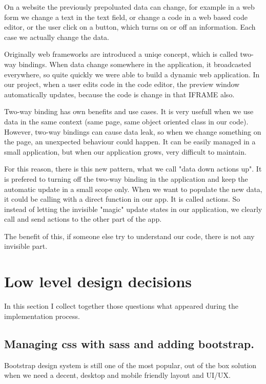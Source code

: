 \documentclass[12pt, a4paper, oneside, openright, medskipamount]{report}
\begin{document}
On a website the previously prepoluated data can change, for example in a web form we change a text in the text field, or change a code in a web based code editor, or the user click on a button, which turns on or off an information. Each case we actually change the data.

Originally web frameworks are introduced a uniqe concept, which is called two-way bindings. When data change somewhere in the application, it broadcasted everywhere, so quite quickly we were able to build a dynamic web application. In our project, when a user edits code in the code editor, the preview window automatically updates, because the code is change in that IFRAME also.

Two-way binding has own benefits and use cases. It is very usefull when we use data in the same context (same page, same object oriented class in our code). However, two-way bindings can cause data leak, so when we change something on the page, an unexpected behaviour could happen. It can be easily managed in a small application, but when our application grows, very difficult to maintain.

For this reason, there is this new pattern, what we call "data down actions up". It is prefered to turning off the two-way binding in the application and keep the automatic update in a small scope only. When we want to populate the new data, it could be calling with a direct function in our app. It is called actions. So instead of letting the invisible "magic" update states in our application, we clearly call and send actions to the other part of the app.

The benefit of this, if someone else try to understand our code, there is not any invisible part.

\section{Low level design decisions}

In this section I collect together those questions what appeared during the implementation process.

\subsection{Managing css with sass and adding bootstrap.}

Bootstrap\cite{bootstrap} design system is still one of the most popular, out of the box solution when we need a decent, desktop and mobile friendly layout and UI/UX.
\end{document}
